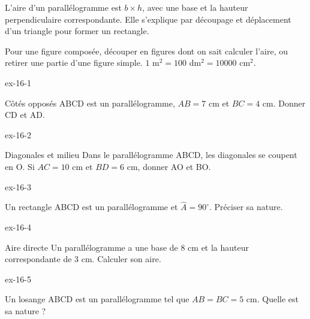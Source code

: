 \begin{propriete}L’aire d’un parallélogramme est $b\times h$, avec une base et la hauteur perpendiculaire correspondante. Elle s’explique par découpage et déplacement d’un triangle pour former un rectangle.\end{propriete}
\begin{savoirfaire}Pour une figure composée, découper en figures dont on sait calculer l’aire, ou retirer une partie d’une figure simple. $1$ m$^2=100$ dm$^2=10000$ cm$^2$.\end{savoirfaire}

\clearpage{}
\begin{blocLivre}{ex-16-1}\begin{exercice}[1]{Côtés opposés}
ABCD est un parallélogramme, $AB=7$ cm et $BC=4$ cm. Donner CD et AD.
\label{fig-ex-16-1}
\end{exercice}\end{blocLivre}
\begin{blocLivre}{ex-16-2}\begin{exercice}[1]{Diagonales et milieu}
Dans le parallélogramme ABCD, les diagonales se coupent en O. Si $AC=10$ cm et $BD=6$ cm, donner AO et BO.
\label{fig-ex-16-2}
\end{exercice}\end{blocLivre}
\begin{blocLivre}{ex-16-3}\begin{exercice}[1]{Un rectangle}
ABCD est un parallélogramme et $\widehat A=90^\circ$. Préciser sa nature.
\label{fig-ex-16-3}
\end{exercice}\end{blocLivre}
\begin{blocLivre}{ex-16-4}\begin{exercice}[1]{Aire directe}
Un parallélogramme a une base de 8 cm et la hauteur correspondante de 3 cm. Calculer son aire.
\label{fig-ex-16-4}
\end{exercice}\end{blocLivre}
\begin{blocLivre}{ex-16-5}\begin{exercice}[1]{Un losange}
ABCD est un parallélogramme tel que $AB=BC=5$ cm. Quelle est sa nature ?
\label{fig-ex-16-5}
\end{exercice}\end{blocLivre}

